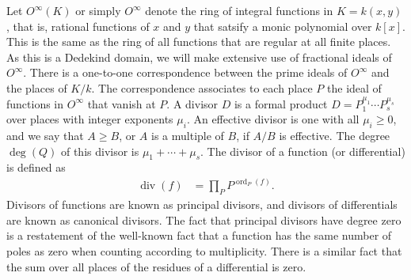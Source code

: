 \documentclass[12pt,reqno]{amsart}
\numberwithin{equation}{section}
\begin{document}
Let $O^{\infty}(K)$ or simply $O^{\infty}$ denote the ring of integral functions in $K=k(x,y)$, that is, rational functions of $x$ and $y$ that satsify a monic polynomial over $k[x]$. This is the same as the ring of all functions that are regular at all finite places. As this is a Dedekind domain, we will make extensive use of fractional ideals of $O^{\infty}$. There is a one-to-one correspondence between the prime ideals of $O^{\infty}$ and the places of $K/k$. The correspondence associates to each place $P$ the ideal of functions in $O^{\infty}$ that vanish at $P$. A divisor $D$ is a formal product $D=P_1^{\mu_1} \cdots P_s^{\mu_s}$ over places with integer exponents $\mu_i$. An effective divisor is one with all $ \mu_i \ge 0$, and we say that $A \ge B$, or $A$ is a multiple of $B$, if $A/B$ is effective. The degree $\operatorname{deg}(Q)$ of this divisor is $\mu_1+\cdots+\mu_s$. The divisor of a function (or differential) is defined as
\begin{align*}
 \operatorname{div}(f)&= \prod_P P^{\operatorname{ord}_P(f)}\text{.}
\end{align*}
Divisors of functions are known as principal divisors, and divisors of differentials are known as canonical divisors. The fact that principal divisors have degree zero is a restatement of the well-known fact that a function has the same number of poles as zero when counting according to multiplicity. There is a similar fact that the sum over all places of the residues of a differential is zero.
\end{document}

